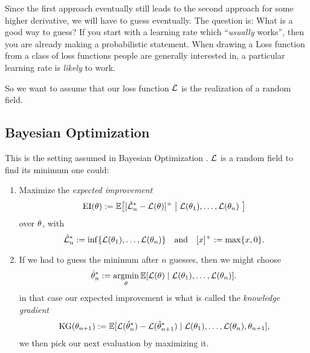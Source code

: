 Since the first approach eventually still leads to the second approach for some
higher derivative, we will have to guess eventually. The question is: What is
a good way to guess? If you start with a learning rate which ``\emph{usually}
works'', then you are already making a probabilistic statement. When drawing a
Loss function from a class of loss functions people are generally interested in,
a particular learning rate is \emph{likely} to work.

So we want to assume that our loss function \(\mathcal{L}\) is the realization of a
random field.

\subsection{Bayesian Optimization}

This is the setting assumed in Bayesian Optimization
\parencite[e.g.][]{frazierBayesianOptimization2018}. \(\mathcal{L}\) is a random field
to find its minimum one could:

\begin{enumerate}
	\item Maximize the \emph{expected improvement} 
	\begin{equation}\label{eq: expected improvement}
		\operatorname{EI}(\theta) := \mathbb{E}\big[
			[\hat{\mathcal{L}}_n^*- \mathcal{L}(\theta)]^+
			\bigm|
			\mathcal{L}(\theta_1),\dots, \mathcal{L}(\theta_n)\
		\big]
	\end{equation}
	over \(\theta\), with
	\begin{equation*}
		\hat{\mathcal{L}}_n^* := \inf\{\mathcal{L}(\theta_1),\dots, \mathcal{L}(\theta_n)\}
		\quad \text{and} \quad
		[x]^+ := \max\{x, 0\}.
	\end{equation*}

	\item If we had to guess the minimum after \(n\) guesses, then we might
	choose
	\begin{equation*}
		\hat{\theta}^*_n
		:= \operatorname*{argmin}_{\theta} \mathbb{E}[\mathcal{L}(\theta)\mid \mathcal{L}(\theta_1), \dots, \mathcal{L}(\theta_n)].
	\end{equation*}
	in that case our expected improvement is what is called the \emph{knowledge gradient}
	\begin{equation*}
		\operatorname{KG}(\theta_{n+1}) := \mathbb{E}[
			\mathcal{L}(\hat{\theta}^*_n) - \mathcal{L}(\hat{\theta}^*_{n+1})
			\mid \mathcal{L}(\theta_1), \dots, \mathcal{L}(\theta_n), \theta_{n+1}
		],
	\end{equation*}
	we then pick our next evaluation by maximizing it.	
\end{enumerate}

